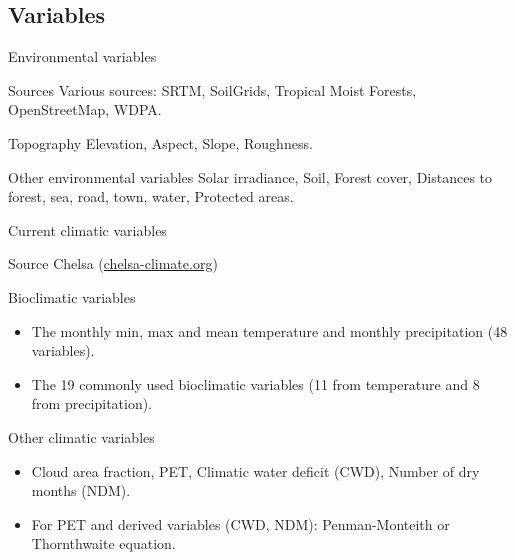 \documentclass[10pt,table,dvipsnames,compress]{beamer}
\begin{document}
\subsection{Variables}
\label{sec:org4c9e00b}

\begin{frame}[label={sec:org0795aa4}]{Environmental variables}
\begin{block}{Sources}
Various sources: SRTM, SoilGrids, Tropical Moist Forests, OpenStreetMap, WDPA. 
\end{block}

\begin{block}{Topography}
Elevation, Aspect, Slope, Roughness.
\end{block}

\begin{block}{Other environmental variables}
Solar irradiance, Soil, Forest cover, Distances to forest, sea, road, town, water, Protected areas.
\end{block}
\end{frame}

\begin{frame}[label={sec:org991350b}]{Current climatic variables}
\begin{block}{Source}
Chelsa (\href{https://chelsa-climate.org)}{chelsa-climate.org})
\end{block}

\begin{block}{Bioclimatic variables}
\begin{itemize}
\item The monthly min, max and mean temperature and monthly precipitation (48 variables).
\item The 19 commonly used bioclimatic variables (11 from temperature and 8 from precipitation).
\end{itemize}
\end{block}

\begin{block}{Other climatic variables}
\begin{itemize}
\item Cloud area fraction, PET, Climatic water deficit (CWD), Number of dry months (NDM).
\item For PET and derived variables (CWD, NDM): Penman-Monteith or Thornthwaite equation.
\end{itemize}
\end{block}
\end{frame}
\end{document}

